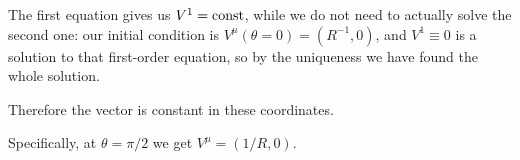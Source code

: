 \documentclass[main.tex]{subfiles}
\begin{document}
The first equation gives us \(V^{1} = \text{const}\), while we do not need to actually solve the second one: our initial condition is \(V^{\mu}(\theta = 0) = (R^{-1}, 0)\), and \(V^{1} \equiv 0\) is a solution to that first-order equation, so by the uniqueness we have found the whole solution.

Therefore the vector is constant in these coordinates.

Specifically, at \(\theta = \pi /2\) we get \(V^{\mu } = (1/R, 0)\).
\end{document}
